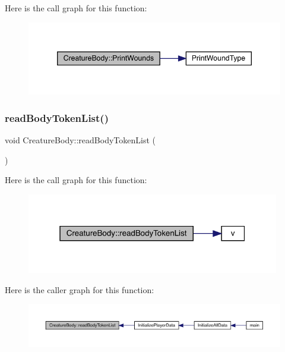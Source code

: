 Here is the call graph for this function\+:
\nopagebreak
\begin{figure}[H]
\begin{center}
\leavevmode
\includegraphics[width=346pt]{da/d7d/class_creature_body_a82e519351551538b1138fea170776f3f_cgraph}
\end{center}
\end{figure}
\mbox{\label{class_creature_body_a52d765dd974e81a549fd0cb27b355cf2}} 
\subsubsection{\texorpdfstring{read\+Body\+Token\+List()}{readBodyTokenList()}}
{\footnotesize\ttfamily void Creature\+Body\+::read\+Body\+Token\+List (\begin{DoxyParamCaption}{ }\end{DoxyParamCaption})}

Here is the call graph for this function\+:
\nopagebreak
\begin{figure}[H]
\begin{center}
\leavevmode
\includegraphics[width=313pt]{da/d7d/class_creature_body_a52d765dd974e81a549fd0cb27b355cf2_cgraph}
\end{center}
\end{figure}
Here is the caller graph for this function\+:
\nopagebreak
\begin{figure}[H]
\begin{center}
\leavevmode
\includegraphics[width=350pt]{da/d7d/class_creature_body_a52d765dd974e81a549fd0cb27b355cf2_icgraph}
\end{center}
\end{figure}
\mbox{\label{class_creature_body_a5fa474a4a6f2c04d6ae55db42e6a9c75}} 
